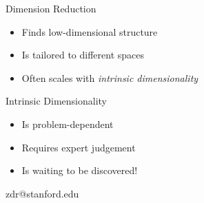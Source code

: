 \documentclass[14pt]{beamer}
\begin{document}
\begin{frame}{Dimension Reduction}
  \begin{itemize}
  \item Finds low-dimensional structure
  \item Is tailored to different spaces
  \item Often scales with \emph{intrinsic dimensionality}
  \end{itemize}
\end{frame}

\begin{frame}{Intrinsic Dimensionality}
  \begin{itemize}
  \item Is problem-dependent
  \item Requires expert judgement
  \item Is waiting to be discovered!
  \end{itemize}

  \bigskip\centering zdr@stanford.edu
\end{frame}
\end{document}
